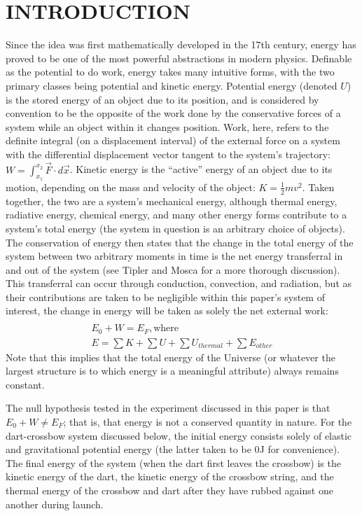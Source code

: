 \documentclass[twocolumn, 10pt]{article}
\begin{document}
\section*{INTRODUCTION}
\hspace{\parindent}	Since the idea was first mathematically developed in the 17th century, energy has proved to be one of the most powerful abstractions in modern physics. Definable as the potential to do work, energy takes many intuitive forms, with the two primary classes being potential and kinetic energy. Potential energy (denoted $U$) is the stored energy of an object due to its position, and is considered by convention to be the opposite of the work done by the conservative forces of a system while an object within it changes position. Work, here, refers to the definite integral (on a displacement interval) of the external force on a system with the differential displacement vector tangent to the system’s trajectory: $W=\int_{x_1}^{x_2} \vec{F}\cdot d\vec{x}$. Kinetic energy is the “active” energy of an object due to its motion, depending on the mass and velocity of the object: $K=\frac{1}{2}mv^2$. Taken together, the two are a system’s mechanical energy, although thermal energy, radiative energy, chemical energy, and many other energy forms contribute to a system’s total energy (the system in question is an arbitrary choice of objects). The conservation of energy then states that the change in the total energy of the system between two arbitrary moments in time is the net energy transferral in and out of the system (see Tipler and Mosca for a more thorough discussion). This transferral can occur through conduction, convection, and radiation, but as their contributions are taken to be negligible within this paper’s system of interest, the change in energy will be taken as solely the net external work:
\vspace{-5pt}
\begin{gather*}
    \\ E_0 + W = E_F, \text{where}
    \\ E = \sum K + \sum U + \sum U_{thermal} + \sum E_{other}
\end{gather*}
Note that this implies that the total energy of the Universe (or whatever the largest structure is to which energy is a meaningful attribute) always remains constant.

The null hypothesis tested in the experiment discussed in this paper is that $E_0 + W \neq E_F$; that is, that energy is not a conserved quantity in nature. For the dart-crossbow system discussed below, the initial energy consists solely of elastic and gravitational potential energy (the latter taken to be 0J for convenience). The final energy of the system (when the dart first leaves the crossbow) is the kinetic energy of the dart, the kinetic energy of the crossbow string, and the thermal energy of the crossbow and dart after they have rubbed against one another during launch.
\end{document}
